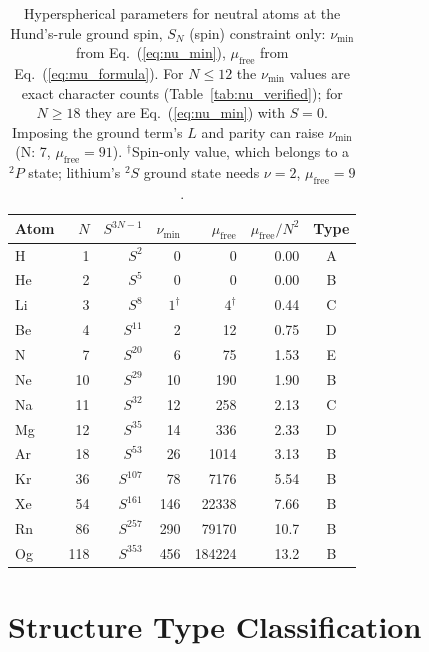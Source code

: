 \documentclass[aps,prl,twocolumn,superscriptaddress,longbibliography]{revtex4-2}
\newcommand{\mufree}{\mu_{\mathrm{free}}}
\begin{document}
\begin{table}[h]
\centering
\caption{Hyperspherical parameters for neutral atoms at the
Hund's-rule ground spin, $S_N$ (spin) constraint only:
$\nu_{\min}$ from Eq.~(\ref{eq:nu_min}), $\mufree$ from
Eq.~(\ref{eq:mu_formula}).  For $N \le 12$ the $\nu_{\min}$ values are
exact character counts (Table~\ref{tab:nu_verified}); for $N \ge 18$
they are Eq.~(\ref{eq:nu_min}) with $S = 0$.  Imposing the ground
term's $L$ and parity can raise $\nu_{\min}$ (N: 7, $\mufree = 91$).
$^\dagger$Spin-only value, which belongs to a ${}^2P$ state; lithium's
${}^2S$ ground state needs $\nu = 2$, $\mufree = 9$.}
\label{tab:mu_values}
\begin{tabular}{lrrrrrc}
\toprule
Atom & $N$ & $S^{3N-1}$ & $\nu_{\min}$ & $\mufree$ & $\mufree/N^2$ & Type \\
\midrule
H     &   1 & $S^2$    &   0 &       0 & 0.00 & A \\
He    &   2 & $S^5$    &   0 &       0 & 0.00 & B \\
Li    &   3 & $S^8$    &   $1^\dagger$ &       $4^\dagger$ & 0.44 & C \\
Be    &   4 & $S^{11}$ &   2 &      12 & 0.75 & D \\
N     &   7 & $S^{20}$ &   6 &      75 & 1.53 & E \\
Ne    &  10 & $S^{29}$ &  10 &     190 & 1.90 & B \\
Na    &  11 & $S^{32}$ &  12 &     258 & 2.13 & C \\
Mg    &  12 & $S^{35}$ &  14 &     336 & 2.33 & D \\
Ar    &  18 & $S^{53}$ &  26 &    1014 & 3.13 & B \\
Kr    &  36 & $S^{107}$&  78 &    7176 & 5.54 & B \\
Xe    &  54 & $S^{161}$& 146 &   22338 & 7.66 & B \\
Rn    &  86 & $S^{257}$& 290 &   79170 & 10.7 & B \\
Og    & 118 & $S^{353}$& 456 &  184224 & 13.2 & B \\
\bottomrule
\end{tabular}
\end{table}


\section{Structure Type Classification}
\label{sec:classification}
\end{document}
